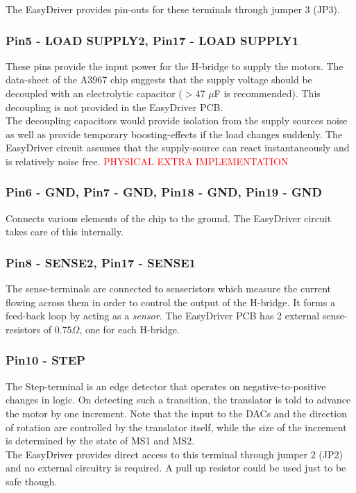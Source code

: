 \documentclass{article}
\newcommand{\xxx}[1]{\textcolor{red}{#1}}
\theoremstyle{plain}
\theoremstyle{definition}
\theoremstyle{remark}
\begin{document}
The EasyDriver provides pin-outs for these terminals through jumper 3 (JP3).

\subsubsection*{Pin5 - LOAD SUPPLY2, Pin17 - LOAD SUPPLY1}
These pins provide the input power for the H-bridge to supply the motors. The data-sheet of the A3967 chip suggests that the supply voltage should be decoupled with an electrolytic capacitor ($>$47 $\mu$F is recommended). This decoupling is not provided in the EasyDriver PCB.\\

The decoupling capacitors would provide isolation from the supply sources noise as well as provide temporary boosting-effects if the load changes suddenly. The EasyDriver circuit assumes that the supply-source can react instantaneously and is relatively noise free.
\xxx{PHYSICAL EXTRA IMPLEMENTATION}

\subsubsection*{Pin6 - GND, Pin7 - GND, Pin18 - GND, Pin19 - GND}
Connects various elements of the chip to the ground. The EasyDriver circuit takes care of this internally.

\subsubsection*{Pin8 - SENSE2, Pin17 - SENSE1}
The sense-terminals are connected to senseristors which measure the current flowing across them in order to control the output of the H-bridge. It forms a feed-back loop by acting as a \emph{sensor}. The EasyDriver PCB has 2 external sense-resistors of $0.75\Omega$, one for each H-bridge.

\subsubsection*{Pin10 - STEP}
The Step-terminal is an edge detector that operates on negative-to-positive changes in logic. On detecting such a transition, the  translator is told to advance the motor by one increment. Note that the input to the DACs and the direction of rotation are controlled by the translator itself, while the size of the increment is determined by the state of MS1  and MS2.\\

The EasyDriver provides direct access to this terminal through jumper 2 (JP2) and no external circuitry is required. A pull up resistor could be used just to be safe though.
\end{document}
